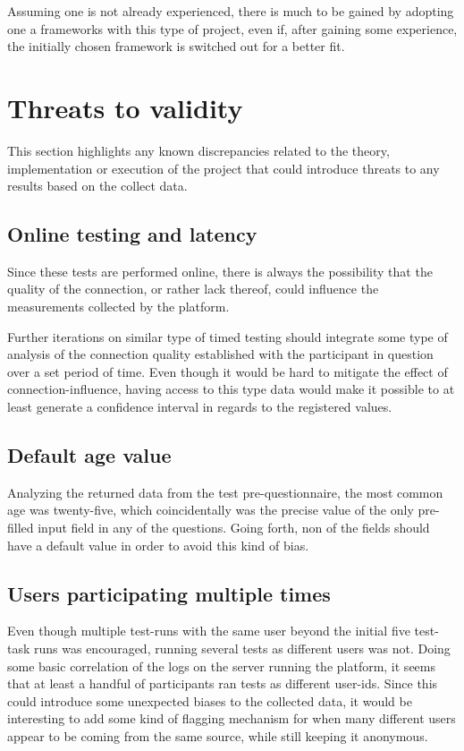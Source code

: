   Assuming one is not already experienced, there is much to be gained by
  adopting one a frameworks with this type of project, even if, after gaining
  some experience, the initially chosen framework is switched out for a better
  fit.

  \section{Threats to validity}

  This section highlights any known discrepancies related to the theory,
  implementation or execution of the project that could introduce threats to
  any results based on the collect data.

  \subsection{Online testing and latency}

  Since these tests are performed online, there is always the possibility that
  the quality of the connection, or rather lack thereof, could influence the
  measurements collected by the platform.

  Further iterations on similar type of timed testing should integrate some
  type of analysis of the connection quality established with the participant
  in question over a set period of time. Even though it would be hard to
  mitigate the effect of connection-influence, having access to this type data
  would make it possible to at least generate a confidence interval in regards
  to the registered values.

  \subsection{Default age value}\label{label_validity_default_age}


  Analyzing the returned data from the test pre-questionnaire, the most common
  age was twenty-five, which coincidentally was the precise value of the only
  pre-filled input field in any of the questions. Going forth, non of the
  fields should have a default value in order to avoid this kind of bias.

  \subsection{Users participating multiple times}

  Even though multiple test-runs with the same user beyond the initial five
  test-task runs was encouraged, running several tests as different users was
  not. Doing some basic correlation of the logs on the server running the
  platform, it seems that at least a handful of participants ran tests as
  different user-ids. Since this could introduce some unexpected biases to the
  collected data, it would be interesting to add some kind of flagging
  mechanism for when many different users appear to be coming from the same
  source, while still keeping it anonymous.
